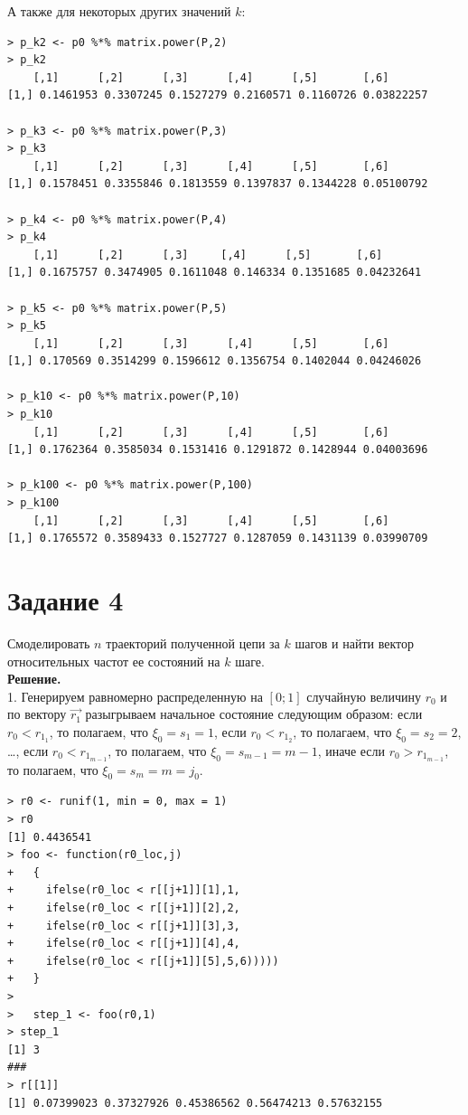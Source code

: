 \documentclass[14pt,a4paper]{scrartcl}
\begin{document}
А также для некоторых других значений $k$:
\begin{verbatim}
> p_k2 <- p0 %*% matrix.power(P,2)
> p_k2
	[,1]      [,2]      [,3]      [,4]      [,5]       [,6]
[1,] 0.1461953 0.3307245 0.1527279 0.2160571 0.1160726 0.03822257

> p_k3 <- p0 %*% matrix.power(P,3)
> p_k3
	[,1]      [,2]      [,3]      [,4]      [,5]       [,6]
[1,] 0.1578451 0.3355846 0.1813559 0.1397837 0.1344228 0.05100792

> p_k4 <- p0 %*% matrix.power(P,4)
> p_k4
	[,1]      [,2]      [,3]     [,4]      [,5]       [,6]
[1,] 0.1675757 0.3474905 0.1611048 0.146334 0.1351685 0.04232641

> p_k5 <- p0 %*% matrix.power(P,5)
> p_k5
	[,1]      [,2]      [,3]      [,4]      [,5]       [,6]
[1,] 0.170569 0.3514299 0.1596612 0.1356754 0.1402044 0.04246026

> p_k10 <- p0 %*% matrix.power(P,10)
> p_k10
	[,1]      [,2]      [,3]      [,4]      [,5]       [,6]
[1,] 0.1762364 0.3585034 0.1531416 0.1291872 0.1428944 0.04003696

> p_k100 <- p0 %*% matrix.power(P,100)
> p_k100
	[,1]      [,2]      [,3]      [,4]      [,5]       [,6]
[1,] 0.1765572 0.3589433 0.1527727 0.1287059 0.1431139 0.03990709
\end{verbatim}

\section*{Задание 4}
Смоделировать $n$ траекторий полученной цепи за $k$ шагов и найти вектор относительных частот ее состояний на $k$ шаге.\\
\textbf{Решение.}\\

1. Генерируем равномерно распределенную на $[0;1]$ случайную величину $r_0$ и по вектору $\vec{r_1}$ разыгрываем начальное состояние следующим образом: если $r_0 < r_{1_1}$, то полагаем, что $\xi_0 = s_1 = 1$, если $r_0 < r_{1_2}$, то полагаем, что $\xi_0 = s_2 = 2$, \ldots, если $r_0 < r_{1_{m-1}}$, то полагаем, что $\xi_0 = s_{m-1} = m-1$, иначе если $r_0 > r_{1_{m-1}}$, то полагаем, что $\xi_0 = s_{m} = m = j_0$.


\begin{verbatim}
> r0 <- runif(1, min = 0, max = 1)
> r0
[1] 0.4436541
> foo <- function(r0_loc,j)
+   {
+     ifelse(r0_loc < r[[j+1]][1],1,
+     ifelse(r0_loc < r[[j+1]][2],2,
+     ifelse(r0_loc < r[[j+1]][3],3,
+     ifelse(r0_loc < r[[j+1]][4],4,
+     ifelse(r0_loc < r[[j+1]][5],5,6)))))
+   }
>   
>   step_1 <- foo(r0,1)
> step_1
[1] 3
###
> r[[1]]
[1] 0.07399023 0.37327926 0.45386562 0.56474213 0.57632155
\end{verbatim}
\end{document}
